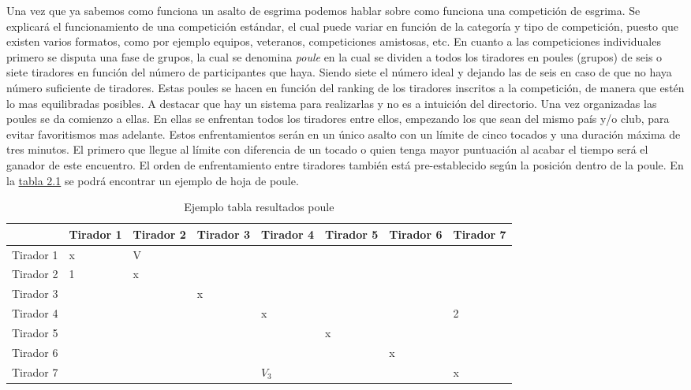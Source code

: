 Una vez que ya sabemos como funciona un asalto de esgrima podemos hablar sobre como funciona una competición
 de esgrima. Se explicará el funcionamiento
 de una competición estándar, el cual puede variar en función de la categoría y tipo de competición, puesto que
 existen varios formatos, como por ejemplo equipos, veteranos, competiciones amistosas, etc.
 En cuanto a las competiciones individuales primero se disputa una fase de grupos, la cual se denomina
 \textit{poule} en la cual se dividen a todos los tiradores en poules (grupos) de seis o siete tiradores en función
 del número de participantes que haya. Siendo siete el número ideal y dejando las de seis en caso de que
 no haya número suficiente de tiradores. Estas poules se hacen en función del ranking de los tiradores inscritos
 a la competición, de manera que estén lo mas equilibradas posibles. A destacar que hay un sistema para realizarlas y no
 es a intuición del directorio. Una vez organizadas las poules se da
 comienzo a ellas. En ellas se enfrentan todos los tiradores entre ellos, empezando los que sean del mismo
 país y/o club, para evitar favoritismos mas adelante. Estos enfrentamientos serán en un único asalto con un
 límite de cinco tocados y una duración máxima de tres minutos. El primero que llegue al límite con diferencia
 de un tocado o quien tenga mayor puntuación al acabar el tiempo será el ganador de este encuentro. El orden
 de enfrentamiento entre tiradores también está pre-establecido según la posición dentro de la poule.
 En la \hyperref[tab:table2_1]{tabla 2.1} se podrá encontrar un ejemplo de hoja de poule.


\begin{table}[htb]%
  \centering
  \caption{Ejemplo tabla resultados poule}
  \label{tab:table2_1}
  \begin{tabular}{ | l | l | l | l | l | l | l | l | }
    \hline
    & Tirador 1 & Tirador 2 & Tirador 3 & Tirador 4 & Tirador 5 & Tirador 6 & Tirador 7 \\ \hline
    Tirador 1 & x & V & & & & & \\ \hline
    Tirador 2 & 1 & x & & & & & \\ \hline
    Tirador 3 & & & x & & & & \\ \hline
    Tirador 4 & & & & x & & & 2 \\ \hline
    Tirador 5 & & & & & x & & \\ \hline
    Tirador 6 & & & & & & x & \\ \hline
    Tirador 7 & & & & $V_3$ & & & x \\
    \hline
  \end{tabular}
\end{table}

